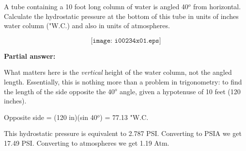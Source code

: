 

A tube containing a 10 foot long column of water is angled 40$^{o}$ from horizontal.  Calculate the hydrostatic pressure at the bottom of this tube in units of inches water column ("W.C.) and also in units of atmospheres. 

$$\texttt{[image: i00234x01.eps]}$$







\noindent
{\bf Partial answer:}

\vskip 10pt

What matters here is the {\it vertical} height of the water column, not the angled length.  Essentially, this is nothing more than a problem in trigonometry: to find the length of the side opposite the 40$^{o}$ angle, given a hypotenuse of 10 feet (120 inches).







Opposite side = (120 in)(sin 40$^{o}$) = 77.13 "W.C.

\vskip 10pt

This hydrostatic pressure is equivalent to 2.787 PSI.  Converting to PSIA we get 17.49 PSI.  Converting to atmospheres we get 1.19 Atm.





